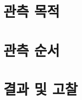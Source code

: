 \documentclass{gshs_observatory}
\begin{document}
	\makecover
	\section{관측 목적}
	\lipsum[1-2]
	\section{관측 순서}
	\lipsum[3-4]
	\section{결과 및 고찰}
	\lipsum[5-6]
\end{document}
